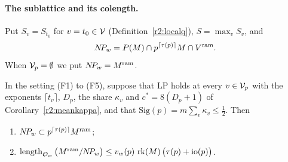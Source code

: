 \paragraph{The sublattice and its colength.} Put $S_v=S_{t_0}$ for $v=t_0\in\mathcal V$ (Definition~\ref{r2:localq}), $S=\max_vS_v$, and
\[
N\!P_w=P(M)\cap p^{\lceil\tau(p)\rceil}M\cap V^{\mathrm{ram}} .
\]
When $\mathcal V_p=\emptyset$ we put $N\!P_w=M^{\mathrm{ram}}$.

\begin{theorem}\label{r2:colength}
In the setting (F1) to (F5), suppose that $\mathrm{LP}$ holds at every $v\in\mathcal V_p$ with the exponents $\lceil t_v\rceil$, $D_p$, the share $\kappa_v$ and $c^*=8(D_p+1)$ of Corollary~\ref{r2:meankappa}, and that $\mathrm{Sig}(p)=m\sum_v\kappa_v\le\frac12$. Then
\begin{enumerate}
\item[(a)] $N\!P_w\subset p^{\lceil\tau(p)\rceil}M^{\mathrm{ram}}$;
\item[(b)] $\operatorname{length}_{\mathcal O_w}\big(M^{\mathrm{ram}}/N\!P_w\big)\le v_w(p)\,\operatorname{rk}(M)\,\big(\tau(p)+\mathrm{io}(p)\big)$.
\end{enumerate}
\end{theorem}


